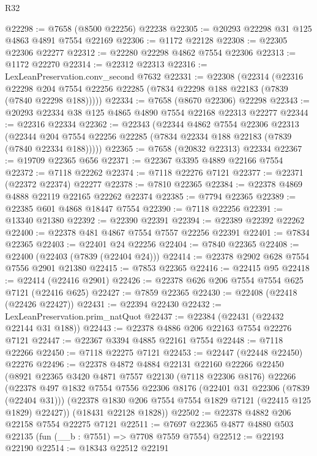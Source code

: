 \begin{lexlean}{R32}
\begin{coremodule}
@22298 := @7658 (@8500 @22256) @22238
@22305 := @20293 @22298 @31 @125 @4863 @4891 @7554 @22169
@22306 := @1172 @22128
@22308 := @22305 @22306 @22277
@22312 := @22280 @22298 @4862 @7554 @22306
@22313 := @1172 @22270
@22314 := @22312 @22313
@22316 := LexLeanPreservation.conv_second @7632
@22331 := @22308
    (@22314
      (@22316
        @22298
        @204
        @7554
        @22256
        @22285
        (@7834 @22298 @188 @22183 (@7839 (@7840 @22298 @188)))))
@22334 := @7658 (@8670 @22306) @22298
@22343 := @20293 @22334 @38 @125 @4865 @4890 @7554 @22168 @22313 @22277
@22344 := @22316 @22334
@22362 := @22343
    (@22344
      @4862
      @7554
      @22306
      @22313
      (@22344 @204 @7554 @22256 @22285 (@7834 @22334 @188 @22183 (@7839 (@7840 @22334 @188)))))
@22365 := @7658 (@20832 @22313) @22334
@22367 := @19709 @22365 @656
@22371 := @22367 @3395 @4889 @22166 @7554
@22372 := @7118 @22262
@22374 := @7118 @22276 @7121
@22377 := @22371 (@22372 @22374) @22277
@22378 := @7810 @22365
@22384 := @22378 @4869 @4888 @22119 @22165 @22262 @22374
@22385 := @7794 @22365
@22389 := @22385 @601 @4868 @18447 @7554
@22390 := @7118 @22256
@22391 := @13340 @21380
@22392 := @22390 @22391
@22394 := @22389 @22392 @22262
@22400 := @22378 @481 @4867 @7554 @7557 @22256 @22391
@22401 := @7834 @22365
@22403 := @22401 @24 @22256
@22404 := @7840 @22365
@22408 := @22400 (@22403 (@7839 (@22404 @24)))
@22414 := @22378 @2902 @628 @7554 @7556 @2901 @21380
@22415 := @7853 @22365
@22416 := @22415 @95
@22418 := @22414 (@22416 @2901)
@22426 := @22378 @626 @206 @7554 @7554 @625 @7121 (@22416 @625)
@22427 := @7859 @22365
@22430 := @22408 (@22418 (@22426 @22427))
@22431 := @22394 @22430
@22432 := LexLeanPreservation.prim_natQuot
@22437 := @22384 (@22431 (@22432 @22144 @31 @188))
@22443 := @22378 @4886 @206 @22163 @7554 @22276 @7121
@22447 := @22367 @3394 @4885 @22161 @7554
@22448 := @7118 @22266
@22450 := @7118 @22275 @7121
@22453 := @22447 (@22448 @22450) @22276
@22496 := @22378
    @4872
    @4884
    @22131
    @22160
    @22266
    @22450
    (@8921
      @22365
      @3420
      @4871
      @7557
      @22130
      (@7118 @22306 @8176)
      @22266
      (@22378
        @497
        @1832
        @7554
        @7556
        @22306
        @8176
        (@22401 @31 @22306 (@7839 (@22404 @31)))
        (@22378 @1830 @206 @7554 @7554 @1829 @7121 (@22415 @125 @1829) @22427))
      (@18431 @22128 @1828))
@22502 := @22378 @4882 @206 @22158 @7554 @22275 @7121
@22511 := @7697 @22365 @4877 @4880 @503 @22135 (fun (__b : @7551) => @7708 @7559 @7554)
@22512 := @22193 @22190
@22514 := @18343 @22512 @22191

\end{coremodule}
\end{lexlean}
